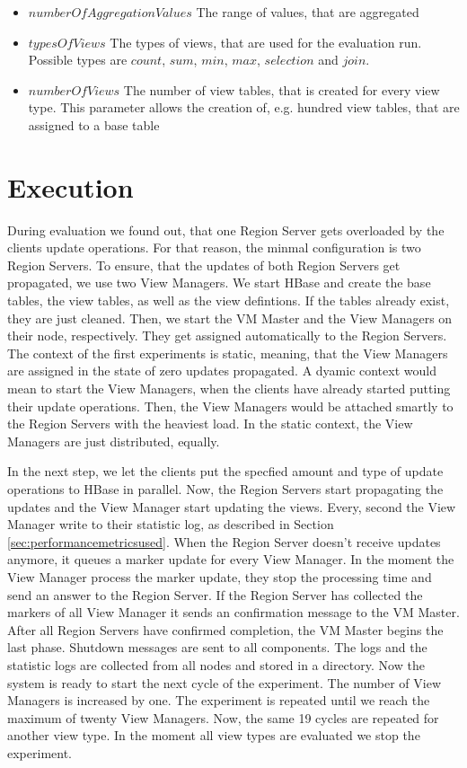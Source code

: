 \documentclass[11pt,a4paper,bibtotoc,idxtotoc,headsepline,footsepline,footexclude,BCOR12mm,DIV13]{scrbook}
\begin{document}
\begin{itemize}
	\item $numberOfAggregationValues$ The range of values, that are aggregated
	\item $typesOfViews$ The types of views, that are used for the evaluation run. Possible types are $count$, $sum$, $min$, $max$, $selection$ and $join$.
	\item $numberOfViews$ The number of view tables, that is created for every view type. This parameter allows the creation of, e.g. hundred view tables, that are assigned to a base table
\end{itemize}



\section{Execution}
\label{sec:execution}

During evaluation we found out, that one Region Server gets overloaded by the clients update operations. For that reason, the minmal configuration is two Region Servers. To ensure, that the updates of both Region Servers get propagated, we use two View Managers. We start HBase and create the base tables, the view tables, as well as the view defintions. If the tables already exist, they are just cleaned. Then, we start the VM Master and the View Managers on their node, respectively. They get assigned automatically to the Region Servers. The context of the first experiments is static, meaning, that the View Managers are assigned in the state of zero updates propagated. A dyamic context would mean to start the View Managers, when the clients have already started putting their update operations. Then, the View Managers would be attached smartly to the Region Servers with the heaviest load. In the static context, the View Managers are just distributed, equally. 

In the next step, we let the clients put the specfied amount and type of update operations to HBase in parallel. Now, the Region Servers start propagating the updates and the View Manager start updating the views. Every, second the View Manager write to their statistic log, as described in Section \ref{sec:performancemetricsused}. When the Region Server doesn't receive updates anymore, it queues a marker update for every View Manager. In the moment the View Manager process the marker update, they stop the processing time and send an answer to the Region Server. If the Region Server has collected the markers of all View Manager it sends an confirmation message to the VM Master. After all Region Servers have confirmed completion, the VM Master begins the last phase. Shutdown messages are sent to all components. The logs and the statistic logs are collected from all nodes and stored in a directory. Now the system is ready to start the next cycle of the experiment. The number of View Managers is increased by one. The experiment is repeated until we reach the maximum of twenty View Managers. Now, the same 19 cycles are repeated for another view type. In the moment all view types are evaluated we stop the experiment.
\end{document}
